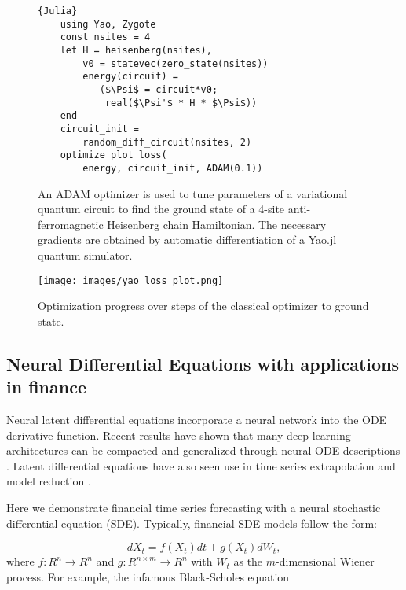 \documentclass{juliacon}
\begin{document}
\begin{figure}
    \begin{minipage}{0.48\textwidth}
    \begin{lstlisting}{Julia}
    using Yao, Zygote
    const nsites = 4
    let H = heisenberg(nsites),
        v0 = statevec(zero_state(nsites))
        energy(circuit) =
           ($\Psi$ = circuit*v0;
            real($\Psi'$ * H * $\Psi$))
    end
    circuit_init =
        random_diff_circuit(nsites, 2)
    optimize_plot_loss(
        energy, circuit_init, ADAM(0.1))
    \end{lstlisting}
  \caption{An ADAM optimizer is used to tune parameters of a variational quantum circuit to find the ground state of a 4-site anti-ferromagnetic Heisenberg chain Hamiltonian. The necessary gradients are obtained by automatic differentiation of a Yao.jl quantum simulator.}
\end{minipage}
  \texttt{[image: images/yao\_loss\_plot.png]}
  \caption{Optimization progress over steps of the classical optimizer to ground state.\label{fig:yao_loss}}
\endminipage
\end{figure}

\subsection{Neural Differential Equations with applications in finance}
\label{diffeq}

    Neural latent differential equations \cite{chen2018neural,pmlr-v5-alvarez09a,latent,DBLP:journals/corr/abs-1902-02376} incorporate a neural network into the ODE derivative function. Recent results have shown that many deep learning architectures can be compacted and generalized through neural ODE descriptions \cite{chen2018neural,He2016DeepRL,2019arXiv190401681D,DBLP:journals/corr/abs-1810-01367}. Latent differential equations have also seen use in time series extrapolation \cite{10.1093/bioinformatics/btn278} and model reduction \cite{ROMEROUGALDE2013170,8062736,2018arXiv180804930B,doi:10.1243/09544062JMES683}.

    Here we demonstrate financial time series forecasting with a neural stochastic differential equation (SDE). Typically, financial SDE models follow the form:

\[
    dX_t = f(X_t)dt + g(X_t)dW_t,
\]
    where
    $f:R^n \rightarrow R^n$ and $g:R^{n\times m} \rightarrow R^n$ with 
    $W_t$ as the $m$-dimensional Wiener process. For example, the infamous Black-Scholes equation
\end{document}

